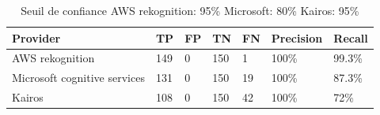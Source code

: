 \begin{table}[H]
\small
\begin{tabular}{|m{2cm} | m{2cm} | m{2cm} | m{2cm} |m{2cm} |m{2cm} |m{2cm}|}
\hline
{\color[HTML]{000000} \textbf{Provider}}              & {\color[HTML]{000000} \textbf{TP}} & {\color[HTML]{000000} \textbf{FP}} & {\color[HTML]{000000} \textbf{TN}} & {\color[HTML]{000000} \textbf{FN}} & {\color[HTML]{000000} \textbf{Precision}} & {\color[HTML]{000000} \textbf{Recall}} \\ \hline
{\color[HTML]{000000} AWS rekognition}                & {\color[HTML]{000000} 149}                    & {\color[HTML]{000000} 0}                       & {\color[HTML]{000000} 150}                    & {\color[HTML]{000000} 1}                       & {\color[HTML]{000000} 100\%}                            & {\color[HTML]{000000} 99.3\%}                        \\ \hline
{\color[HTML]{000000} Microsoft cognitive   services} & {\color[HTML]{000000} 131}                    & {\color[HTML]{000000} 0}                       & {\color[HTML]{000000} 150}                    & {\color[HTML]{000000} 19}                      & {\color[HTML]{000000} 100\%}                            & {\color[HTML]{000000} 87.3\%}                        \\ \hline
{\color[HTML]{000000} Kairos}                         & {\color[HTML]{000000} 108}                    & {\color[HTML]{000000} 0}                       & {\color[HTML]{000000} 150}                    & {\color[HTML]{000000} 42}                      & {\color[HTML]{000000} 100\%}                            & {\color[HTML]{000000} 72\%}                          \\ \hline
\end{tabular}
\caption{Seuil de confiance AWS rekognition: 95\% Microsoft: 80\% Kairos: 95\%}
\end{table}


